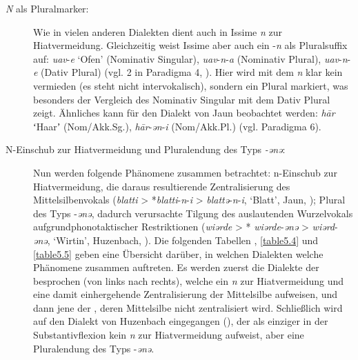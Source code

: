 \begin{description}
 \item[\textit{N} als Pluralmarker:]
Wie in vielen anderen Dialekten dient auch in Issime \textit{n} zur Hiatvermeidung. Gleichzeitig weist Issime aber auch ein -\textit{n} als Pluralsuffix auf: \textit{uav}-\textit{e} ‘Ofen’ (Nominativ Singular), \textit{uav}-\textit{n}-\textit{a} (Nominativ Plural), \textit{uav}-\textit{n}-\textit{e} (Dativ Plural) (vgl.  2 in Paradigma 4, \citealt[164]{Zürrer1999}). Hier wird mit dem \textit{n} klar kein  vermieden (es steht nicht intervokalisch), sondern ein Plural markiert, was besonders der Vergleich des Nominativ Singular mit dem Dativ Plural zeigt. Ähnliches kann für den Dialekt von Jaun beobachtet werden: \textit{h\=ar} ʻHaarʼ (Nom/Akk.Sg.), \textit{h\=ar}{}-\textit{ən}{}-\textit{i} (Nom/Akk.Pl.) (vgl. Paradigma 6).

\item[N-Einschub zur Hiatvermeidung und Pluralendung des Typs \textit{-ənə}:] Nun werden folgende Phänomene zusammen betrachtet: n-Einschub zur Hiatvermeidung, die daraus resultierende Zentralisierung des Mittelsilbenvokals (\textit{blatti} > *\textit{blatti}-\textit{n}-\textit{i} > \textit{blattə}-\textit{n}-\textit{i}, ‘Blatt’, Jaun, \citealt[267]{Stucki1917}); Plural des Typs -\textit{ənə}, dadurch verursachte Tilgung des auslautenden Wurzelvokals aufgrund\linebreak phonotaktischer Restriktionen (\textit{wiərde} > * \textit{wiərde}-\textit{ənə} > \textit{wiərd}-\textit{ənə}, ‘Wirtin’, Huzenbach, \citealt[97]{Baur1967}). Die folgenden Tabellen , \ref{table5.4} und \ref{table5.5} geben eine Übersicht darüber, in welchen Dialekten welche Phänomene zusammen auftreten. Es werden zuerst die Dialekte der  besprochen (von links nach rechts), welche ein \textit{n} zur Hiatvermeidung und eine damit einhergehende Zentralisierung der Mittelsilbe aufweisen, und dann jene der , deren Mittelsilbe nicht zentralisiert wird. Schließlich wird auf den Dialekt von Huzenbach eingegangen (), der als einziger in der Substantivflexion kein \textit{n} zur Hiatvermeidung aufweist, aber eine Pluralendung des Typs -\textit{ənə}.
\end{description}


